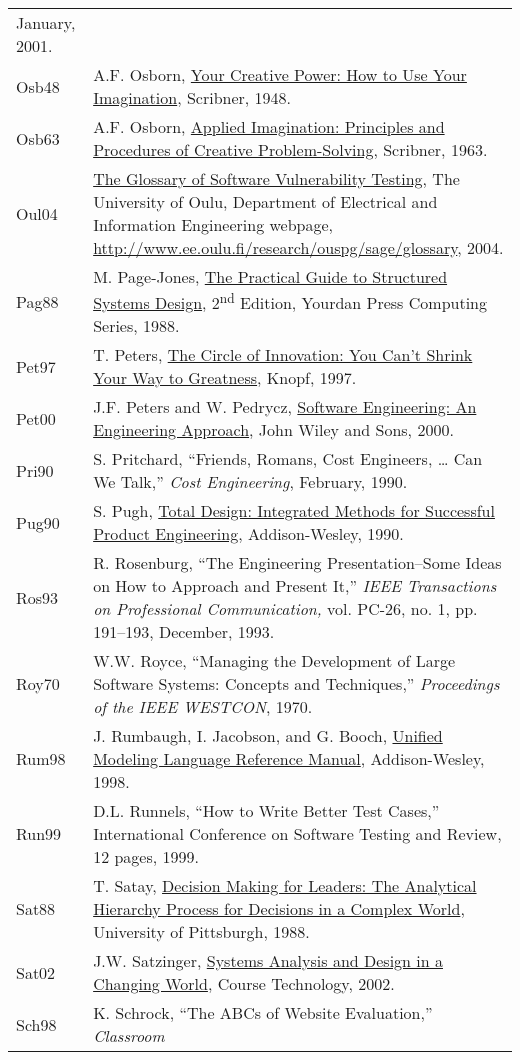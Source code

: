 \begin{longtable}[]{@{}
  >{\raggedright\arraybackslash}p{}
  >{\raggedright\arraybackslash}p{}@{}}
January, 2001. \\
Osb48 & A.F. Osborn, \ul{Your Creative Power: How to Use Your
Imagination}, Scribner, 1948. \\
Osb63 & A.F. Osborn, \ul{Applied Imagination: Principles and Procedures
of Creative Problem-Solving}, Scribner, 1963. \\
Oul04 & \ul{The Glossary of Software Vulnerability Testing,} The
University of Oulu, Department of Electrical and Information Engineering
webpage, \url{http://www.ee.oulu.fi/research/ouspg/sage/glossary},
2004. \\
Pag88 & M. Page-Jones, \ul{The Practical Guide to Structured Systems
Design}, 2\textsuperscript{nd} Edition, Yourdan Press Computing Series,
1988. \\
Pet97 & T. Peters, \ul{The Circle of Innovation: You Can't Shrink Your
Way to Greatness}, Knopf, 1997. \\
Pet00 & J.F. Peters and W. Pedrycz, \ul{Software Engineering: An
Engineering Approach}, John Wiley and Sons, 2000. \\
Pri90 & S. Pritchard, ``Friends, Romans, Cost Engineers, \ldots{} Can We
Talk,'' \emph{Cost Engineering}, February, 1990. \\
Pug90 & S. Pugh, \ul{Total Design: Integrated Methods for Successful
Product Engineering}, Addison-Wesley, 1990. \\
Ros93 & R. Rosenburg, ``The Engineering Presentation--Some Ideas on How
to Approach and Present It,'' \emph{IEEE Transactions on Professional
Communication,} vol. PC-26, no. 1, pp. 191--193, December, 1993. \\
Roy70 & W.W. Royce, ``Managing the Development of Large Software
Systems: Concepts and Techniques,'' \emph{Proceedings of the IEEE
WESTCON}, 1970. \\
Rum98 & J. Rumbaugh, I. Jacobson, and G. Booch, \ul{Unified Modeling
Language Reference Manual}, Addison-Wesley, 1998. \\
Run99 & D.L. Runnels, ``How to Write Better Test Cases,'' International
Conference on Software Testing and Review, 12 pages, 1999. \\
Sat88 & T. Satay, \ul{Decision Making for Leaders: The Analytical
Hierarchy Process for Decisions in a Complex World}, University of
Pittsburgh, 1988. \\
Sat02 & J.W. Satzinger, \ul{Systems Analysis and Design in a Changing
World}, Course Technology, 2002. \\
Sch98 & K. Schrock, ``The ABCs of Website Evaluation,'' \emph{Classroom
}
\end{longtable}
